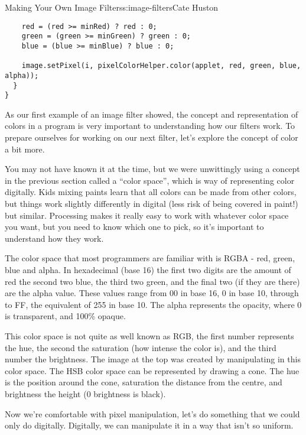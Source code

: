 \begin{aosachapter}{Making Your Own Image Filters}{s:image-filters}{Cate Huston}
\begin{verbatim}
    red = (red >= minRed) ? red : 0;
    green = (green >= minGreen) ? green : 0;
    blue = (blue >= minBlue) ? blue : 0;
    
    image.setPixel(i, pixelColorHelper.color(applet, red, green, blue, alpha));
  }
}
\end{verbatim}

\label{color}

As our first example of an image filter showed, the concept and
representation of colors in a program is very important to understanding
how our filters work. To prepare ourselves for working on our next
filter, let's explore the concept of color a bit more.

You may not have known it at the time, but we were unwittingly using a
concept in the previous section called a ``color space'', which is way
of representing color digitally. Kids mixing paints learn that all
colors can be made from other colors, but things work slightly
differently in digital (less risk of being covered in paint!) but
similar. Processing makes it really easy to work with whatever color
space you want, but you need to know which one to pick, so it's
important to understand how they work.

\label{rgb-colors}

The color space that most programmers are familiar with is RGBA - red,
green, blue and alpha. In hexadecimal (base 16) the first two digits are
the amount of red the second two blue, the third two green, and the
final two (if they are there) are the alpha value. These values range
from 00 in base 16, 0 in base 10, through to FF, the equivalent of 255
in base 10. The alpha represents the opacity, where 0 is transparent,
and 100\% opaque.

\label{hsb-or-hsv-colors}

This color space is not quite as well known as RGB, the first number
represents the hue, the second the saturation (how intense the color
is), and the third number the brightness. The image at the top was
created by manipulating in this color space. The HSB color space can be
represented by drawing a cone. The hue is the position around the cone,
saturation the distance from the centre, and brightness the height (0
brightness is black).

\label{extracting-the-dominant-hue-from-an-image}

Now we're comfortable with pixel manipulation, let's do something that
we could only do digitally. Digitally, we can manipulate it in a way
that isn't so uniform.


\end{aosachapter}
